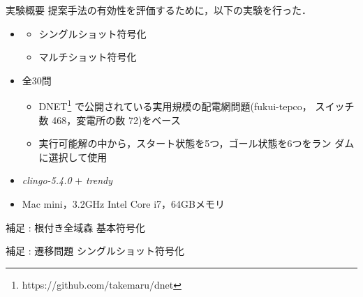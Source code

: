 \begin{frame}{実験概要}
  \renewcommand{\thefootnote}{\fnsymbol{footnote}}
  \setcounter{footnote}{1}
  提案手法の有効性を評価するために，以下の実験を行った．
  \vfill
  \begin{itemize}
  \item {}
    \begin{itemize}
    \item シングルショット符号化
    \item マルチショット符号化
    \end{itemize}
  \item {} 全30問
    \begin{itemize}
    \item DNET\footnote{https://github.com/takemaru/dnet}
      で公開されている実用規模の配電網問題(\textsf{fukui-tepco}，
      スイッチ数 468，変電所の数 72)をベース
    \item 実行可能解の中から，スタート状態を5つ，ゴール状態を6つをラン
      ダムに選択して使用
    \end{itemize}
  \item {} \textit{clingo-5.4.0} $+$ \textit{trendy}
  \item {} Mac mini，3.2GHz Intel Core i7，64GBメモリ
  \end{itemize}
\end{frame}


\begin{frame}[fragile]{補足 : 根付き全域森 基本符号化}

\end{frame}

\begin{frame}[fragile]{補足 : 遷移問題 シングルショット符号化}

\begin{multicols*}{2}

\end{multicols*}
\end{frame}

